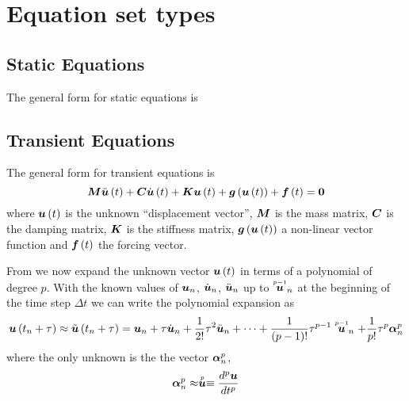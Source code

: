 \section{Equation set types}

\subsection{Static Equations}

The general form for static equations is

\subsection{Transient Equations}

The general form for transient equations is
\begin{equation}
  \matr{M}\fnof{\ddot{\vect{u}}}{t}+\matr{C}\fnof{\dot{\vect{u}}}{t}+\matr{K}\fnof{\vect{u}}{t}+
  \fnof{\vect{g}}{\fnof{\vect{u}}{t}}+\fnof{\vect{f}}{t}=\vect{0}
  \label{eqn:generaltransientnonlinear}
\end{equation}
where $\fnof{\vect{u}}{t}$ is the unknown ``displacement vector'', $\matr{M}$
is the mass matrix, $\matr{C}$ is the damping matrix, $\matr{K}$ is the
stiffness matrix, $\fnof{\vect{g}}{\fnof{\vect{u}}{t}}$ a non-linear vector
function and $\fnof{\vect{f}}{t}$ the forcing vector.

From \cite{zienkiewicz:2006_1} we now expand the unknown vector $\fnof{\vect{u}}{t}$ in terms of a polynomial of degree
$p$. With the known values of $\vect{u}_{n}$, $\dot{\vect{u}}_{n}$,
$\ddot{\vect{u}}_{n}$ up to $\symover{p-1}{\vect{u}}_{n}$ at the beginning of
the time step $\Delta t$ we can write the polynomial expansion as
\begin{equation}
  \fnof{\vect{u}}{t_{n}+\tau}\approx\fnof{\tilde{\vect{u}}}{t_{n}+\tau}=\vect{u}_{n}+\tau\dot{\vect{u}}_{n}+
  \frac{1}{2!}\tau^{2}\ddot{\vect{u}}_{n}+\cdots+\dfrac{1}{\factorial{p-1}}\tau^{p-1}\symover{p-1}{\vect{u}}_{n}+
  \dfrac{1}{p!}\tau^{p}\vect{\alpha}^{p}_{n}
  \label{eqn:timepolyexpansion}
\end{equation}
where the only unknown is the the vector $\vect{\alpha}^{p}_{n}$,
\begin{equation}
  \vect{\alpha}^{p}_{n}\approx\symover{p}{\vect{u}}\equiv\dnby{p}{\vect{u}}{t}
\end{equation}

